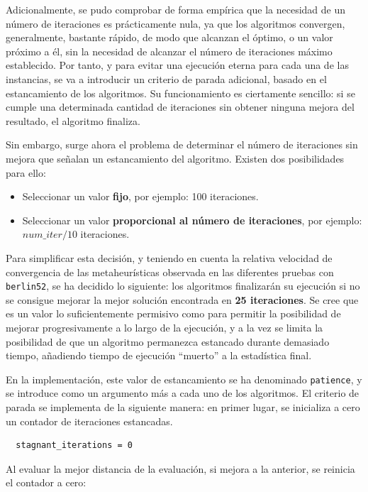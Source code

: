 Adicionalmente, se pudo comprobar de forma empírica que la necesidad de un número de iteraciones es prácticamente nula, ya que
los algoritmos convergen, generalmente, bastante rápido, de modo que alcanzan el óptimo, o un valor próximo a él, sin la 
necesidad de alcanzar el número de iteraciones máximo establecido. Por tanto, y para evitar una ejecución eterna para cada una
de las instancias, se va a introducir un criterio de parada adicional, basado en el estancamiento de los algoritmos. Su 
funcionamiento es ciertamente sencillo: si se cumple una determinada cantidad de iteraciones sin obtener ninguna mejora del
resultado, el algoritmo finaliza.

Sin embargo, surge ahora el problema de determinar el número de iteraciones sin mejora que señalan un estancamiento del
algoritmo. Existen dos posibilidades para ello:
\begin{itemize}
  \item Seleccionar un valor \textbf{fijo}, por ejemplo: 100 iteraciones.
  \item Seleccionar un valor \textbf{proporcional al número de iteraciones}, por ejemplo: $\textit{num\_iter} / 10$ iteraciones.
\end{itemize}

Para simplificar esta decisión, y teniendo en cuenta la relativa velocidad de convergencia de las metaheurísticas observada en
las diferentes pruebas con \texttt{berlin52}, se ha decidido lo siguiente: los algoritmos finalizarán su ejecución si no se
consigue mejorar la mejor solución encontrada en \textbf{25 iteraciones}. Se cree que es un valor lo suficientemente permisivo
como para permitir la posibilidad de mejorar progresivamente a lo largo de la ejecución, y a la vez se limita la posibilidad de 
que un algoritmo permanezca estancado durante demasiado tiempo, añadiendo tiempo de ejecución ``muerto'' a la estadística final. 

En la implementación, este valor de estancamiento se ha denominado \texttt{patience}, y se introduce como un argumento más a 
cada uno de los algoritmos. El criterio de parada se implementa de la siguiente manera: en primer lugar, se inicializa a cero un
contador de iteraciones estancadas.

\begin{verbatim}
  stagnant_iterations = 0
\end{verbatim}

Al evaluar la mejor distancia de la evaluación, si mejora a la anterior, se reinicia el contador a cero:

